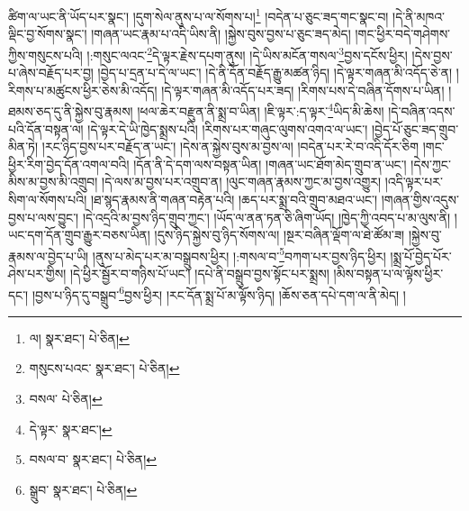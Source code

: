 ཚིག་ལ་ཡང་ནི་ཡོད་པར་སྣང་། །དུག་སེལ་ནུས་པ་ལ་སོགས་པ།\footnote{ལ།  སྣར་ཐང་།  པེ་ཅིན། } །བདེན་པ་ཅུང་ཟད་གང་སྣང་བ། །དེ་ནི་མཁའ་ལྡིང་བྱ་སོགས་སྣང་། །གཞན་ཡང་རྣམ་པ་འདི་ཡིས་ནི། །སྐྱེས་བུས་བྱས་པ་ཅུང་ཟད་མེད། །གང་ཕྱིར་བདེ་གཤེགས་ཀྱིས་གསུངས་པའི། །:གསུང་ལའང་\footnote{གསུངས་པའང་  སྣར་ཐང་།  པེ་ཅིན། }དེ་ལྟར་རྗེས་དཔག་ནུས། །དེ་ཡིས་མངོན་གསལ་\footnote{བསལ་  པེ་ཅིན། }བྱས་དངོས་ཕྱིར། །དེས་བྱས་པ་ཞེས་བརྗོད་པར་བྱ། །བྱེད་པ་དྲན་པ་དེ་ལ་ཡང་། །དེ་ནི་དོན་བརྗོད་རྒྱུ་མཚན་ཉིད། །དེ་ལྟར་གཞན་མི་འདོད་ཅེ་ན། །རིགས་པ་མཚུངས་ཕྱིར་ཅེས་མི་འདོད། །དེ་ལྟར་གཞན་མི་འདོད་པར་ཟད། །རིགས་པས་དེ་བཞིན་དོགས་པ་ཡིན། །ཐམས་ཅད་དུ་ནི་སྐྱེས་བུ་རྣམས། །ཕལ་ཆེར་བརྫུན་ནི་སྨྲ་བ་ཡིན། །ཇི་ལྟར་:ད་ལྟར་\footnote{དེ་ལྟར་  སྣར་ཐང་། }ཡིད་མི་ཆེས། །དེ་བཞིན་འདས་པའི་དོན་བསྟན་ལ། །དེ་ལྟར་དེ་ཡི་ཁྱེད་སྨྲས་པའི། །རིགས་པར་གཞུང་ལུགས་འགའ་ལ་ཡང་། །བྱེད་པོ་ཅུང་ཟད་གྲུབ་མིན་ཏེ། །རང་ཉིད་བྱས་པར་བརྗོད་ན་ཡང་། །དེས་ན་སྐྱེས་བུས་མ་བྱས་ལ། །བདེན་པར་རེ་བ་འདི་དོར་ཅིག །གང་ཕྱིར་རིག་བྱེད་དོན་འགལ་བའི། །དོན་ནི་དེ་དག་ལས་བསྟན་ཡིན། །གཞན་ཡང་ཐོག་མེད་གྲུབ་ན་ཡང་། །དེས་ཀྱང་མིས་མ་བྱས་མི་འགྲུབ། །དེ་ལས་མ་བྱས་པར་འགྲུབ་ན། །ལུང་གཞན་རྣམས་ཀྱང་མ་བྱས་འགྱུར། །འདི་ལྟར་པར་སིག་ལ་སོགས་པའི། །ཐ་སྙད་རྣམས་ནི་གཞན་བརྟེན་པའི། །ཆད་པར་སྨྲ་བའི་གྲུབ་མཐའ་ཡང་། །གཞན་གྱིས་འདུས་བྱས་པ་ལས་བྱུང་། །དེ་འདྲའི་མ་བྱས་ཉིད་གྲུབ་ཀྱང་། །ཡོད་ལ་ནན་ཏན་ཅི་ཞིག་ཡོད། །ཁྱེད་ཀྱི་འབད་པ་མ་ལུས་ནི། །ཡང་དག་དོན་གྲུབ་རྒྱུར་བཅས་ཡིན། །དུས་ཉིད་སྐྱེས་བུ་ཉིད་སོགས་ལ། །སྔར་བཞིན་ལྡོག་ལ་ཐེ་ཚོམ་ཟ། །སྐྱེས་བུ་རྣམས་ལ་བྱེད་པ་ཡི། །ནུས་པ་མེད་པར་མ་བསྒྲུབས་ཕྱིར། །:གསལ་བ་\footnote{བསལ་བ་  སྣར་ཐང་།  པེ་ཅིན། }བཀག་པར་བྱས་ཉིད་ཕྱིར། །སྨྲ་པོ་བྱེད་པོར་ཤེས་པར་གྱིས། །དེ་ཕྱིར་སྦྱོར་བ་གཉིས་པོ་ཡང་། །དཔེ་ནི་བསྒྲུབ་བྱས་སྟོང་པར་སྨྲས། །མིས་བསྟན་པ་ལ་ལྟོས་ཕྱིར་དང་། །བྱས་པ་ཉིད་དུ་བསྒྲུབ་\footnote{སྒྲུབ་  སྣར་ཐང་།  པེ་ཅིན། }བྱས་ཕྱིར། །རང་དོན་སྨྲ་པོ་མ་ལྟོས་ཉིད། །ཆོས་ཅན་དཔེ་དག་ལ་ནི་མེད། །
